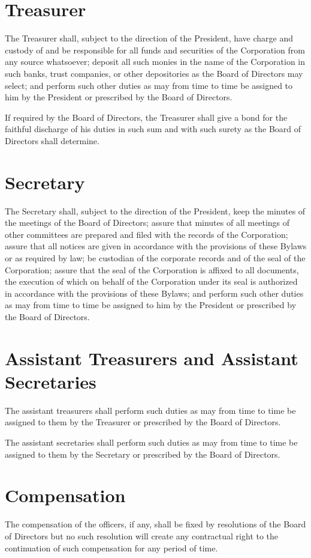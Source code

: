 \section{Treasurer}

The Treasurer shall, subject to the direction of the President, have charge and
custody of and be responsible for all funds and securities of the Corporation
from any source whatsoever; deposit all such monies in the name of the
Corporation in such banks, trust companies, or other depositories as the Board
of Directors may select; and perform such other duties as may from time to time
be assigned to him by the President or prescribed by the Board of Directors.

If required by the Board of Directors, the Treasurer shall give a bond for the
faithful discharge of his duties in such sum and with such surety as the Board
of Directors shall determine.

\section{Secretary}

The Secretary shall, subject to the direction of the President, keep the
minutes of the meetings of the Board of Directors; assure that minutes of all
meetings of other committees are prepared and filed with the records of the
Corporation; assure that all notices are given in accordance with the
provisions of these Bylaws or as required by law; be custodian of the corporate
records and of the seal of the Corporation; assure that the seal of the
Corporation is affixed to all documents, the execution of which on behalf of
the Corporation under its seal is authorized in accordance with the provisions
of these Bylaws; and perform such other duties as may from time to time be
assigned to him by the President or prescribed by the Board of Directors.

\section{Assistant Treasurers and Assistant Secretaries}

The assistant treasurers shall perform such duties as may from time to time be
assigned to them by the Treasurer or prescribed by the Board of Directors.

The assistant secretaries shall perform such duties as may from time to time be
assigned to them by the Secretary or prescribed by the Board of Directors.

\section{Compensation}

The compensation of the officers, if any, shall be fixed by resolutions of the
Board of Directors but no such resolution will create any contractual right to
the continuation of such compensation for any period of time.

